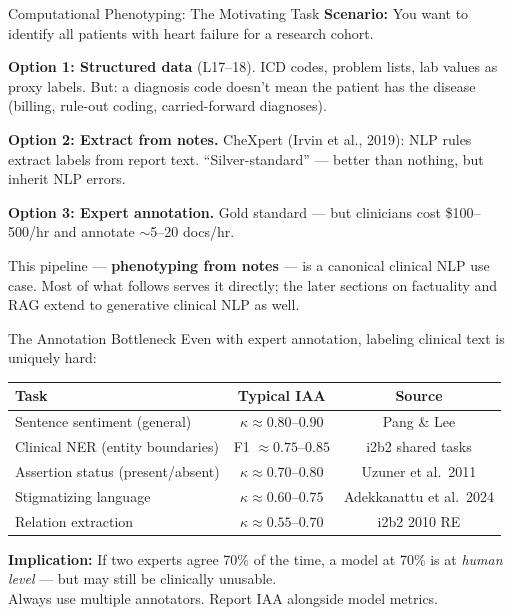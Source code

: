 \documentclass[aspectratio=169,11pt]{beamer}
\begin{document}
\begin{frame}{Computational Phenotyping: The Motivating Task}
\textbf{Scenario:} You want to identify all patients with heart failure for a research cohort.

\vspace{0.2em}
\small
\textbf{Option 1: Structured data} (L17--18).
ICD codes, problem lists, lab values as proxy labels. But: a diagnosis code doesn't mean the patient has the disease (billing, rule-out coding, carried-forward diagnoses).

\vspace{0.2em}
\textbf{Option 2: Extract from notes.}
CheXpert (Irvin et al., 2019): NLP rules extract labels from report text. ``Silver-standard'' --- better than nothing, but inherit NLP errors.

\vspace{0.2em}
\textbf{Option 3: Expert annotation.}
Gold standard --- but clinicians cost \$100--500/hr and annotate $\sim$5--20 docs/hr.

\vspace{0.2em}
This pipeline --- \textbf{phenotyping from notes} --- is a canonical clinical NLP use case. Most of what follows serves it directly; the later sections on factuality and RAG extend to generative clinical NLP as well.
\end{frame}

\begin{frame}{The Annotation Bottleneck}
Even with expert annotation, labeling clinical text is uniquely hard:

\vspace{0.2em}
\small
\begin{center}
\begin{tabular}{lcc}
\toprule
\textbf{Task} & \textbf{Typical IAA} & \textbf{Source} \\
\midrule
Sentence sentiment (general) & $\kappa \approx 0.80$--$0.90$ & Pang \& Lee \\
Clinical NER (entity boundaries) & F1 $\approx 0.75$--$0.85$ & i2b2 shared tasks \\
Assertion status (present/absent) & $\kappa \approx 0.70$--$0.80$ & Uzuner et al.\ 2011 \\
Stigmatizing language & $\kappa \approx 0.60$--$0.75$ & Adekkanattu et al.\ 2024 \\
Relation extraction & $\kappa \approx 0.55$--$0.70$ & i2b2 2010 RE \\
\bottomrule
\end{tabular}
\end{center}

\vspace{0.2em}
\textbf{Implication:} If two experts agree 70\% of the time, a model at 70\% is at \emph{human level} --- but may still be clinically unusable.\\[0.2em]
\alert{Always use multiple annotators. Report IAA alongside model metrics.}
\end{frame}
\end{document}
